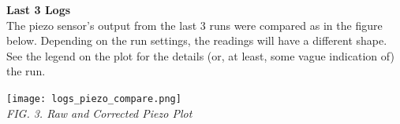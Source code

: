 \documentclass{article}
\begin{document}
	\twocolumn
	
	{\centering\textbf{Last 3 Logs}\\}
	The piezo sensor's output from the last 3 runs were compared as in the figure below. Depending on the run settings, the readings will have a different shape. See the legend on the plot for the details (or, at least, some vague indication of) the run.
	
	{\centering \texttt{[image: logs\_piezo\_compare.png]}\\
	\textit{FIG. 3. Raw and Corrected Piezo Plot}\\}
	
\end{document}
